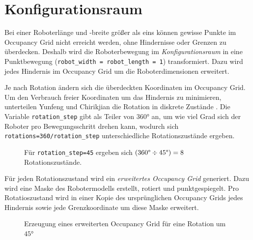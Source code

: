 \chapter{Konfigurationsraum} \label{ch:config-space}
Bei einer Roboterlänge und -breite größer als eins können gewisse Punkte im Occupancy Grid nicht erreicht werden, ohne Hindernisse oder Grenzen zu überdecken. 
Deshalb wird die Roboterbewegung im \textit{Konfigurationsraum} in eine Punktbewegung (\texttt{robot\_width = robot\_length = 1}) transformiert.
Dazu wird jedes Hindernis im Occupancy Grid um die Roboterdimensionen erweitert. \cite{roberts.1999}

Je nach Rotation ändern sich die überdeckten Koordinaten im Occupancy Grid.
Um den Verbrauch freier Koordinaten um das Hindernis zu minimieren, unterteilen Yunfeng und Chirikjian die Rotation in diskrete Zustände \cite{wang.2000}. Die Variable \texttt{rotation\_step} gibt als Teiler von $360$° an, um wie viel Grad sich der Roboter pro Bewegungsschritt drehen kann, wodurch sich \texttt{rotations=360/\texttt{rotation\_step}} unterschiedliche Rotationszustände ergeben.
\begin{figure}[H]
	\centering
	\footnotesize
	\centerline{\resizebox{0.6\linewidth}{!}{}}
	\caption{Für \texttt{rotation\_step=45} ergeben sich $(360 \text{\textdegree} \div 45 \text{\textdegree}) = 8$ Rotationszustände.}
\end{figure}

\vspace*{-0.2cm}
Für jeden Rotationszustand wird ein \textit{erweitertes Occupancy Grid} generiert. Dazu wird eine Maske des Robotermodells erstellt, rotiert und punktgespiegelt. Pro Rotatioszustand wird in einer Kopie des ursprünglichen Occupancy Grids jedes Hindernis sowie jede Grenzkoordinate um diese Maske erweitert.
\begin{figure}[H]
	\centering
	\footnotesize
	\centerline{\resizebox{0.97\linewidth}{!}{}}
	\caption{Erzeugung eines erweiterten Occupancy Grid für eine Rotation um $45$°}
\end{figure}

